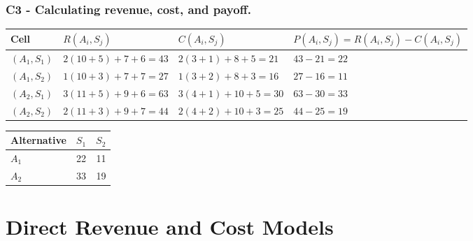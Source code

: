 \subsubsection*{C3 - Calculating revenue, cost, and payoff.}
\label{subsec:problem2-advanced-general-c3}

\begin{center}
	\begin{tabular}{llll}
		\toprule
		Cell
		& \(R(A_i,S_j)\)
		& \(C(A_i,S_j)\)
		& \(P(A_i,S_j)=R(A_i,S_j)-C(A_i,S_j)\) \\
		\midrule
		\((A_1,S_1)\)
		& \(2(10+5)+7+6=43\)
		& \(2(3+1)+8+5=21\)
		& \(43-21=22\) \\
		
		\((A_1,S_2)\)
		& \(1(10+3)+7+7=27\)
		& \(1(3+2)+8+3=16\)
		& \(27-16=11\) \\
		
		\((A_2,S_1)\)
		& \(3(11+5)+9+6=63\)
		& \(3(4+1)+10+5=30\)
		& \(63-30=33\) \\
		
		\((A_2,S_2)\)
		& \(2(11+3)+9+7=44\)
		& \(2(4+2)+10+3=25\)
		& \(44-25=19\) \\
		\bottomrule
	\end{tabular}
\end{center}

\begin{center}
	\begin{tabular}{lrr}
		\toprule
		Alternative & \(S_1\) & \(S_2\) \\
		\midrule
		\(A_1\) & 22 & 11 \\
		\(A_2\) & 33 & 19 \\
		\bottomrule
	\end{tabular}
\end{center}


\section{Direct Revenue and Cost Models}
\label{sec:direct-revenue-cost-models}


